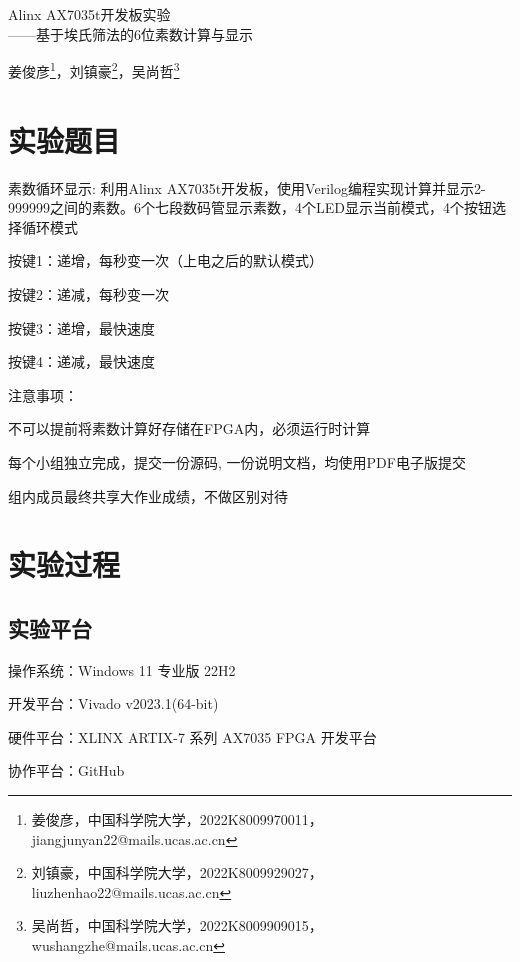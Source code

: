 \def\allfiles{}


	\setlength{\baselineskip}{22pt}
	 \pagestyle{fancy}
	\begin{center}
		\Huge Alinx AX7035t开发板实验\\
		\Large ——基于埃氏筛法的6位素数计算与显示
	\end{center}
	\begin{center}
		\large \kaishu 姜俊彦\footnote{姜俊彦，中国科学院大学，2022K8009970011，jiangjunyan22@mails.ucas.ac.cn}，刘镇豪\footnote{刘镇豪，中国科学院大学，2022K8009929027，liuzhenhao22@mails.ucas.ac.cn}，吴尚哲\footnote{吴尚哲，中国科学院大学，2022K8009909015，wushangzhe@mails.ucas.ac.cn}
	\end{center}
	\begin{spacing}{1.5}
		\tableofcontents
	\end{spacing}
	\setcounter{page}{1}
	\thispagestyle{fancy}
	\newpage
	\section{实验题目}
	\large\kaishu  素数循环显示: 利用Alinx AX7035t开发板，使用Verilog编程实现计算并显示2-999999之间的素数。6个七段数码管显示素数，4个LED显示当前模式，4个按钮选择循环模式
	
	\begin{compactitem}
		\item 按键1：递增，每秒变一次（上电之后的默认模式）
		\item 按键2：递减，每秒变一次
		\item 按键3：递增，最快速度
		\item 按键4：递减，最快速度
	\end{compactitem}
	注意事项：
	\begin{compactenum}
		\item 不可以提前将素数计算好存储在FPGA内，必须运行时计算
		\item 每个小组独立完成，提交一份源码, 一份说明文档，均使用PDF电子版提交
		\item 组内成员最终共享大作业成绩，不做区别对待
	\end{compactenum}
	\section{实验过程}
	\songti
	\subsection{实验平台}
	\begin{compactitem}
		\item 操作系统：Windows 11 专业版 22H2
		\item 开发平台：Vivado v2023.1(64-bit)
		\item 硬件平台：XLINX ARTIX-7 系列 AX7035 FPGA 开发平台
		\item 协作平台：GitHub
	\end{compactitem}
